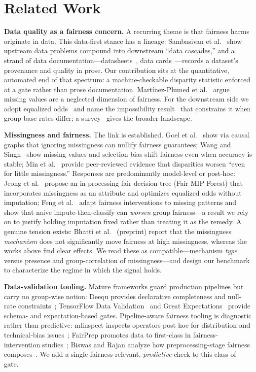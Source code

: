 \documentclass[sigconf,nonacm]{acmart}
\begin{document}
\section{Related Work}\label{sec:related}
\textbf{Data quality as a fairness concern.}
A recurring theme is that fairness harms originate in data. This data-first stance has a lineage:
Sambasivan et al.~\cite{sambasivan2021} show upstream data problems compound into downstream
``data cascades,'' and a strand of data documentation---datasheets~\cite{gebru2021datasheets},
data cards~\cite{pushkarna2022datacards}---records a dataset's provenance and quality in prose. Our
contribution sits at the quantitative, automated end of that spectrum: a machine-checkable
disparity statistic enforced at a gate rather than prose documentation. Mart\'inez-Plumed et
al.~\cite{martinezplumed2021} argue missing values are a neglected dimension of fairness. For the
downstream side we adopt equalized odds~\cite{hardt2016} and name the impossibility
result~\cite{chouldechova2017} that constrains it when group base rates differ; a
survey~\cite{caton2024} gives the broader landscape.

\textbf{Missingness and fairness.}
The link is established. Goel et al.~\cite{goel2021} show via causal graphs that ignoring
missingness can nullify fairness guarantees; Wang and Singh~\cite{wangsingh2021} show missing
values and selection bias shift fairness even when accuracy is stable; Min et
al.~\cite{min2025} provide peer-reviewed evidence that disparities worsen ``even for little
missingness.'' Responses are predominantly model-level or post-hoc: Jeong et
al.~\cite{jeong2022} propose an in-processing fair decision tree (Fair MIP Forest) that
incorporates missingness as an attribute and optimizes equalized odds without imputation;
Feng et al.~\cite{feng2023} adapt fairness interventions to missing patterns and show that
naive impute-then-classify can \emph{worsen} group fairness---a result we rely on to justify
holding imputation fixed rather than treating it as the remedy. A genuine tension exists:
Bhatti et al.~\cite{bhatti2025} (preprint) report that the missingness \emph{mechanism} does
not significantly move fairness at high missingness, whereas the works above find clear
effects. We read these as compatible---mechanism \emph{type} versus presence and
group-correlation of missingness---and design our benchmark to characterize the regime in
which the signal holds.

\textbf{Data-validation tooling.}
Mature frameworks guard production pipelines but carry no group-wise notion: Deequ provides
declarative completeness and null-rate constraints~\cite{schelter2018deequ}; TensorFlow Data
Validation~\cite{caveness2020} and Great Expectations~\cite{greatexpectations} provide schema-
and expectation-based gates. Pipeline-aware fairness tooling is diagnostic rather than
predictive: mlinspect inspects operators post hoc for distribution and technical-bias
issues~\cite{grafberger2022}; FairPrep promotes data to first-class in fairness-intervention
studies~\cite{schelter2020fairprep}; Biswas and Rajan analyze how preprocessing-stage fairness
composes~\cite{biswasrajan2021}. We add a single fairness-relevant, \emph{predictive} check to
this class of gate.
\end{document}
